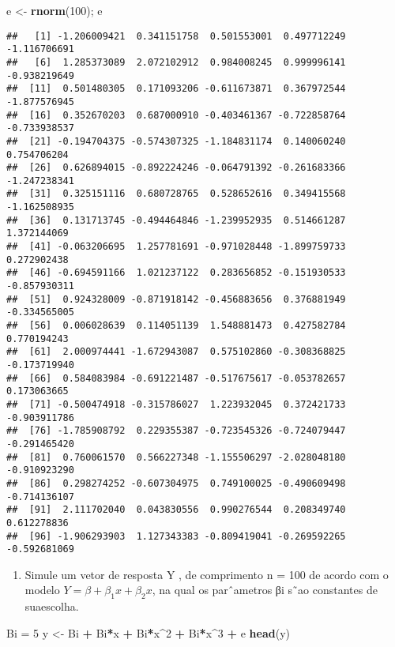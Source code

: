 \documentclass[]{article}
\newenvironment{Shaded}{\begin{snugshade}}{\end{snugshade}}
\newcommand{\DecValTok}[1]{\textcolor[rgb]{0.00,0.00,0.81}{#1}}
\newcommand{\KeywordTok}[1]{\textcolor[rgb]{0.13,0.29,0.53}{\textbf{#1}}}
\newcommand{\NormalTok}[1]{#1}
\newcommand{\OperatorTok}[1]{\textcolor[rgb]{0.81,0.36,0.00}{\textbf{#1}}}
\newcommand{\StringTok}[1]{\textcolor[rgb]{0.31,0.60,0.02}{#1}}
\providecommand{\tightlist}{%
  \setlength{\itemsep}{0pt}\setlength{\parskip}{0pt}}
\begin{document}
\begin{Shaded}
\begin{Highlighting}[]
\NormalTok{e <-}\StringTok{ }\KeywordTok{rnorm}\NormalTok{(}\DecValTok{100}\NormalTok{); e}
\end{Highlighting}
\end{Shaded}

\begin{verbatim}
##   [1] -1.206009421  0.341151758  0.501553001  0.497712249 -1.116706691
##   [6]  1.285373089  2.072102912  0.984008245  0.999996141 -0.938219649
##  [11]  0.501480305  0.171093206 -0.611673871  0.367972544 -1.877576945
##  [16]  0.352670203  0.687000910 -0.403461367 -0.722858764 -0.733938537
##  [21] -0.194704375 -0.574307325 -1.184831174  0.140060240  0.754706204
##  [26]  0.626894015 -0.892224246 -0.064791392 -0.261683366 -1.247238341
##  [31]  0.325151116  0.680728765  0.528652616  0.349415568 -1.162508935
##  [36]  0.131713745 -0.494464846 -1.239952935  0.514661287  1.372144069
##  [41] -0.063206695  1.257781691 -0.971028448 -1.899759733  0.272902438
##  [46] -0.694591166  1.021237122  0.283656852 -0.151930533 -0.857930311
##  [51]  0.924328009 -0.871918142 -0.456883656  0.376881949 -0.334565005
##  [56]  0.006028639  0.114051139  1.548881473  0.427582784  0.770194243
##  [61]  2.000974441 -1.672943087  0.575102860 -0.308368825 -0.173719940
##  [66]  0.584083984 -0.691221487 -0.517675617 -0.053782657  0.173063665
##  [71] -0.500474918 -0.315786027  1.223932045  0.372421733 -0.903911786
##  [76] -1.785908792  0.229355387 -0.723545326 -0.724079447 -0.291465420
##  [81]  0.760061570  0.566227348 -1.155506297 -2.028048180 -0.910923290
##  [86]  0.298274252 -0.607304975  0.749100025 -0.490609498 -0.714136107
##  [91]  2.111702040  0.043830556  0.990276544  0.208349740  0.612278836
##  [96] -1.906293903  1.127343383 -0.809419041 -0.269592265 -0.592681069
\end{verbatim}

\begin{enumerate}
\def\labelenumi{(\alph{enumi})}
\setcounter{enumi}{1}
\tightlist
\item
  Simule um vetor de resposta Y , de comprimento n = 100 de acordo com o
  modelo \(Y =\beta + \beta_{1} x + \beta_{2}x\), na qual os parˆametros
  βi s˜ao constantes de suaescolha.
\end{enumerate}

\begin{Shaded}
\begin{Highlighting}[]
\NormalTok{Bi =}\StringTok{ }\DecValTok{5}
\NormalTok{y <-}\StringTok{ }\NormalTok{Bi }\OperatorTok{+}\StringTok{ }\NormalTok{Bi}\OperatorTok{*}\NormalTok{x }\OperatorTok{+}\StringTok{ }\NormalTok{Bi}\OperatorTok{*}\NormalTok{x}\OperatorTok{^}\DecValTok{2} \OperatorTok{+}\StringTok{ }\NormalTok{Bi}\OperatorTok{*}\NormalTok{x}\OperatorTok{^}\DecValTok{3} \OperatorTok{+}\StringTok{ }\NormalTok{e}
\KeywordTok{head}\NormalTok{(y)}
\end{Highlighting}
\end{Shaded}
\end{document}
